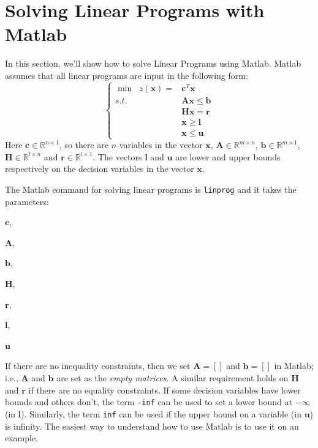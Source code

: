 \section{Solving Linear Programs with Matlab}\label{sec:Matlab}
In this section, we'll show how to solve Linear Programs using Matlab. Matlab assumes that all linear programs are input in the following form:
\begin{equation}
\left\{
\begin{aligned}
\min\;\; z(\mathbf{x}) = &\mathbf{c}^T\mathbf{x}\\
s.t.\;\;&\mathbf{A}\mathbf{x} \leq \mathbf{b}\\
& \mathbf{H}\mathbf{x} = \mathbf{r}\\
& \mathbf{x} \geq \mathbf{l}\\
& \mathbf{x} \leq \mathbf{u}
\end{aligned}\right.
\label{eqn:MatlabForm}
\end{equation}
Here $\mathbf{c} \in \mathbb{R}^{n \times 1}$, so there are $n$ variables in the vector $\mathbf{x}$, $\mathbf{A} \in \mathbb{R}^{m \times n}$, $\mathbf{b} \in \mathbb{R}^{m \times 1}$, $\mathbf{H} \in \mathbb{R}^{l \times n}$ and $\mathbf{r} \in \mathbb{R}^{l \times 1}$. The vectors $\mathbf{l}$ and $\mathbf{u}$ are lower and upper bounds respectively on the decision variables in the vector $\mathbf{x}$.

The Matlab command for solving linear programs is \texttt{linprog} and it takes the parameters:
\begin{enumerate*}
\item $\mathbf{c}$,
\item $\mathbf{A}$,
\item $\mathbf{b}$,
\item $\mathbf{H}$,
\item $\mathbf{r}$,
\item $\mathbf{l}$,
\item $\mathbf{u}$
\end{enumerate*}
If there are no inequality constraints, then we set $\mathbf{A} = []$ and $\mathbf{b} = []$ in Matlab; i.e., $\mathbf{A}$ and $\mathbf{b}$ are set as the \textit{empty matrices}. A similar requirement holds on $\mathbf{H}$ and $\mathbf{r}$ if there are no equality constraints. If some decision variables have lower bounds and others don't, the term \texttt{-inf} can be used to set a lower bound at $-\infty$ (in $\mathbf{l}$). Similarly, the term \texttt{inf} can be used if the upper bound on a variable (in $\mathbf{u}$) is infinity. The easiest way to understand how to use Matlab is to use it on an example.

